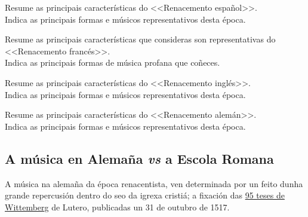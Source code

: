 \begin{ejercicio}
Resume as principais características do <<Renacemento español>>.\\
Indica as principais formas e músicos representativos desta época.
\par
\vspace{9cm}
\end{ejercicio}

\begin{ejercicio}
Resume as principais características que consideras son representativas do <<Renacemento francés>>.\\
Indica as principais formas de música profana que coñeces.
\par
\vspace{5cm}
\end{ejercicio}

\begin{ejercicio}
Resume as principais características do <<Renacemento inglés>>.\\
Indica as principais formas e músicos representativos desta época.
\par
\vspace{5cm}
\end{ejercicio}

\begin{ejercicio}
Resume as principais características do <<Renacemento alemán>>.\\
Indica as principais formas e músicos representativos desta época.
\par
\vspace{5cm}
\end{ejercicio}


\subsection*{A música en Alemaña \emph{vs} a Escola Romana}

A música na alemaña da época renacentista, ven determinada por un feito dunha grande repercusión dentro do seo da igrexa cristiá; a fixación das \href{http://es.wikipedia.org/wiki/Las_95_tesis}{95 teses de Wittemberg} de Lutero, publicadas un 31 de outubro de 1517. 

